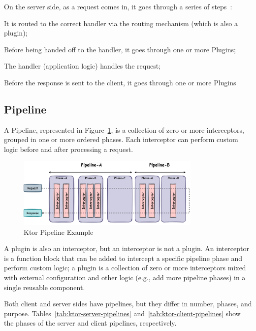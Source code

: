 On the server side, as a request comes in, it goes through a series of steps~\cite{ktor-server-plugins}:

\begin{boldenumerate}
    \item It is routed to the correct handler via the routing mechanism (which is also a plugin);
    \item Before being handed off to the handler, it goes through one or more Plugins;
    \item The handler (application logic) handles the request;
    \item Before the response is sent to the client, it goes through one or more Plugins
\end{boldenumerate}

\subsection{Pipeline}\label{subsec:pipeline}

A Pipeline, represented in Figure~\ref{fig:ktor-pipeline}, is a collection of zero or more interceptors, grouped in one or more ordered phases.
Each interceptor can perform custom logic before and after processing a request.

\begin{figure}[!htb]
    \centering
    \includegraphics[width=0.8\textwidth]{../figures/03_ktor-pipeline}
    \caption{Ktor Pipeline Example}
    \label{fig:ktor-pipeline}
\end{figure}

A plugin is also an interceptor, but an interceptor is not a plugin.
An interceptor is a function block that can be added to intercept a specific pipeline phase and perform custom logic;
a plugin is a collection of zero or more interceptors mixed with external configuration and other logic
(e.g., add more pipeline phases) in a single reusable component.

Both client and server sides have pipelines, but they differ in number, phases, and purpose.
Tables~\ref{tab:ktor-server-pipelines} and~\ref{tab:ktor-client-pipelines} show the phases of the server and client pipelines, respectively.

